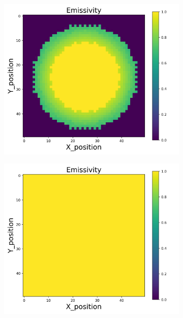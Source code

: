 \begin{figure}[p]
    \centering
    \begin{minipage}{\textwidth}
        \centering
        \begin{subfigure}{0.325\textwidth}
            \centering
            \includegraphics[width=\textwidth]{figures/raw_data/0/linear/emi_cal.jpg}
        \end{subfigure}
        \begin{subfigure}{0.325\textwidth}
            \centering
            \includegraphics[width=\textwidth]{figures/raw_data/5/linear/emi_cal.jpg}

\end{subfigure}
\end{minipage}
\end{figure}
